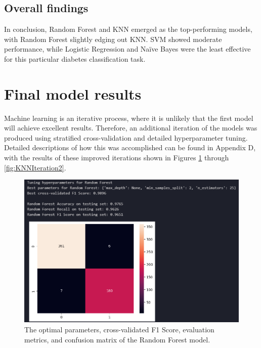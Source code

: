 \documentclass[12pt]{report}
\begin{document}

\subsection{Overall findings}
In conclusion, Random Forest and KNN emerged as the top-performing models, with Random Forest slightly edging out KNN.
SVM showed moderate performance, while Logistic Regression and Naïve Bayes were the least effective for this particular diabetes classification
task.

\section{Final model results}\label{sec:FinalResults}
Machine learning is an iterative process, where it is unlikely that the first model will achieve excellent results.
Therefore, an additional iteration of the models was produced using stratified cross-validation and detailed hyperparameter tuning.
Detailed descriptions of how this was accomplished can be found in Appendix D, with the results of these improved iterations shown 
in Figures \ref{fig:RFIteration2} through \ref{fig:KNNIteration2}.


\begin{figure}[H]
    \centering
    \includegraphics[width=\linewidth]{ModelDev/Iteration2/Results/RF.png}
    \caption{The optimal parameters, cross-validated F1 Score, evaluation metrics, and confusion matrix of the Random Forest model.}
    \label{fig:RFIteration2}
\end{figure}
\end{document}
